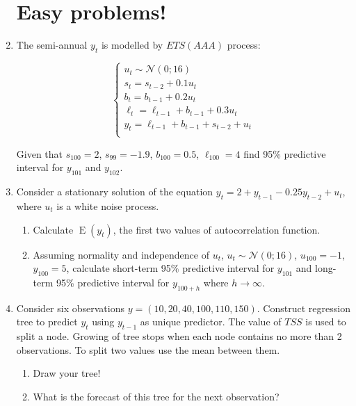 \documentclass[12pt]{article}
\DeclareMathOperator{\E}{E}
\def \cN{\mathcal{N}}
\begin{document}
\begin{enumerate}


\section*{Easy problems!}

\item The semi-annual $y_t$ is modelled by $ETS(AAA)$ process:
    
\[
\begin{cases}
	u_t \sim \cN(0; 16) \\
	s_t = s_{t-2} + 0.1 u_t \\
	b_t = b_{t-1} + 0.2 u_t \\
	\ell_t = \ell_{t-1} + b_{t-1} + 0.3 u_t \\
	y_t = \ell_{t-1} + b_{t-1} + s_{t-2} + u_t \\
\end{cases}    
\]

Given that $s_{100} = 2$, $s_{99} = -1.9$, $b_{100} = 0.5$, $\ell_{100} = 4$ find 95\% predictive interval for $y_{101}$ and $y_{102}$. 


\item Consider a stationary solution of the equation $y_t = 2 + y_{t-1} - 0.25 y_{t-2} + u_t $, 
	where $u_t$ is a white noise process. 

\begin{enumerate}
	\item Calculate $\E(y_t)$, the first two values of autocorrelation function.
	\item Assuming normality and independence of $u_t$, $u_t \sim \cN(0; 16)$, $u_{100}=-1$, $y_{100}=5$, 
	calculate short-term 95\% predictive interval for $y_{101}$ and long-term 95\% predictive interval for $y_{100+h}$ 
	where $h \to \infty$.
\end{enumerate}


\item Consider six observations $y = (10, 20, 40, 100, 110, 150)$. 
Construct regression tree to predict $y_t$ using $y_{t-1}$ as unique predictor.
The value of $TSS$ is used to split a node. Growing of tree stops when each node contains no more than 2 observations. 
To split two values use the mean between them. 

\begin{enumerate}
	\item Draw your tree!
	\item What is the forecast of this tree for the next observation?
\end{enumerate}




\end{enumerate}
\end{document}
